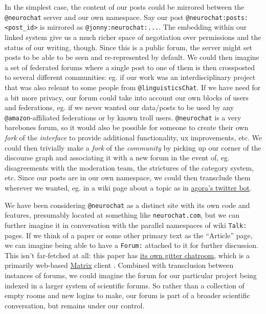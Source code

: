 \documentclass[10pt]{article}
\begin{document}
\begin{multicols}{2}
In the simplest case, the content of our posts could be mirrored between
the \texttt{@neurochat} server and our own namespace. Say our post
\texttt{@neurochat:posts:\textless{}post\_id\textgreater{}} is mirrored
as \texttt{@jonny:neurochat:...}. The embedding within our linked system
give us a much richer space of negotiation over permissions and the
status of our writing, though. Since this is a public forum, the server
might set posts to be able to be seen and re-represented by default. We
could then imagine a set of federated forums where a single post to one
of them is then crossposted to several different communities: eg. if our
work was an interdisciplinary project that was also releant to some
people from \texttt{@linguisticsChat}. If we have need for a bit more
privacy, our forum could take into account our own blocks of users and
federations, eg. if we never wanted our data/posts to be used by any
\texttt{@amazon}-affiliated federations or by known troll users.
\texttt{@neurochat} is a very barebones forum, so it would also be
possible for someone to create their own \emph{fork} of the
\emph{interface} to provide additional functionality, ux improvements,
etc. We could then trivially make a \emph{fork} of the \emph{community}
by picking up our corner of the discourse graph and associating it with
a new forum in the event of, eg. disagreements with the moderation team,
the strictures of the category system, etc. Since our posts are in our
own namespace, we could then transclude them wherever we wanted, eg. in
a wiki page about a topic as in
\href{https://anagora.org/node/agora-bot}{agora's twitter bot}.

We have been considering \texttt{@neurochat} as a distinct site with its
own code and features, presumably located at something like
\texttt{neurochat.com}, but we can further imagine it in conversation
with the parallel namespaces of wiki \texttt{Talk:} pages. If we think
of a paper or some other primary text as the ``Article'' page, we can
imagine being able to have a \texttt{Forum:} attached to it for further
discussion. This isn't far-fetched at all: this paper has
\href{https://gitter.im/scientific-infrastructure/community}{its own
gitter chatroom}, which is a primarily web-based
\href{https://matrix.org/}{Matrix} client \cite{hodgsonGitterNowSpeaks2020, hodgsonWelcomingGitterMatrix2020} .
Combined with transclusion between instances of forums, we could imagine
the forum for our particular project being indexed in a larger system of
scientific forums. So rather than a collection of empty rooms and new
logins to make, our forum is part of a broader scientific conversation,
but remains under our control.


\end{multicols}
\end{document}
